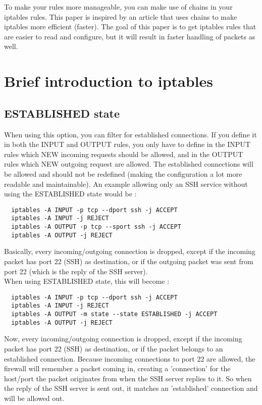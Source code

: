 \documentclass[a4paper,12pt]{article}
\begin{document}
To make your rules more manageable, you can make use of chains in your iptables rules. This paper is inspired by an article that uses chains to make iptables more efficient (faster). The goal of this paper is to get iptables rules that are easier to read and configure, but it will result in faster handling of packets as well.\\

\section{Brief introduction to iptables}
\subsection{ESTABLISHED state}
When using this option, you can filter for established connections. If you define it in both the INPUT and OUTPUT rules, you only have to define in the INPUT rules which NEW incoming requests should be allowed, and in the OUTPUT rules which NEW outgoing request are allowed. The established connections will be allowed and should not be redefined (making the configuration a lot more readable and maintainable). An example allowing only an SSH service without using the ESTABLISHED state would be :
\begin{verbatim}
  iptables -A INPUT -p tcp --dport ssh -j ACCEPT
  iptables -A INPUT -j REJECT
  iptables -A OUTPUT -p tcp --sport ssh -j ACCEPT
  iptables -A OUTPUT -j REJECT
\end{verbatim}

Basically, every incoming/outgoing connection is dropped, except if the incoming packet has port 22 (SSH) as destination, or if the outgoing packet was sent from port 22 (which is the reply of the SSH server).\\

When using ESTABLISHED state, this will become :
\begin{verbatim}
  iptables -A INPUT -p tcp --dport ssh -j ACCEPT
  iptables -A INPUT -j REJECT
  iptables -A OUTPUT -m state --state ESTABLISHED -j ACCEPT
  iptables -A OUTPUT -j REJECT
\end{verbatim}

Now, every incoming/outgoing connection is dropped, except if the incoming packet has port 22 (SSH) as destination, or if the packet belongs to an established connection. Because incoming connections to port 22 are allowed, the firewall will remember a packet coming in, creating a 'connection' for the host/port the packet originates from when the SSH server replies to it. So when the reply of the SSH server is sent out, it matches an 'established' connection and will be allowed out.\\
\end{document}
